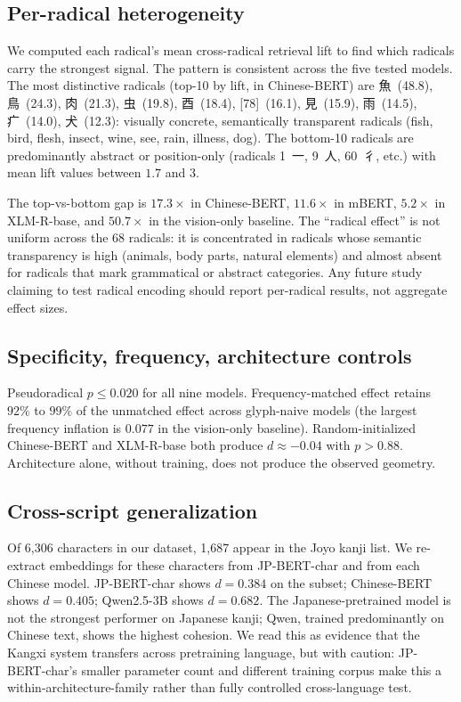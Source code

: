 \documentclass[11pt,a4paper,twocolumn]{article}
\begin{document}
\subsection{Per-radical heterogeneity}
We computed each radical's mean cross-radical retrieval lift to find
which radicals carry the strongest signal. The pattern is consistent
across the five tested models. The most distinctive radicals (top-10
by lift, in Chinese-BERT) are 魚~(48.8), 鳥~(24.3), 肉~(21.3),
虫~(19.8), 酉~(18.4), [78]~(16.1), 見~(15.9), 雨~(14.5), 疒~(14.0),
犬~(12.3): visually concrete, semantically transparent radicals (fish,
bird, flesh, insect, wine, see, rain, illness, dog). The bottom-10
radicals are predominantly abstract or position-only (radicals
1~一, 9~人, 60~彳, etc.) with mean lift values between $1.7$ and $3$.

The top-vs-bottom gap is $17.3\times$ in Chinese-BERT, $11.6\times$ in
mBERT, $5.2\times$ in XLM-R-base, and $50.7\times$ in the vision-only
baseline. The ``radical effect'' is not uniform across the 68 radicals:
it is concentrated in radicals whose semantic transparency is high
(animals, body parts, natural elements) and almost absent for radicals
that mark grammatical or abstract categories. Any future study
claiming to test radical encoding should report per-radical results,
not aggregate effect sizes.

\subsection{Specificity, frequency, architecture controls}
Pseudoradical $p \le 0.020$ for all nine models. Frequency-matched
effect retains $92\%$ to $99\%$ of the unmatched effect across
glyph-naive models (the largest frequency inflation is $0.077$ in the
vision-only baseline). Random-initialized Chinese-BERT and XLM-R-base
both produce $d \approx -0.04$ with $p > 0.88$. Architecture alone,
without training, does not produce the observed geometry.

\subsection{Cross-script generalization}
Of 6{,}306 characters in our dataset, 1{,}687 appear in the Joyo kanji
list. We re-extract embeddings for these characters from JP-BERT-char
and from each Chinese model. JP-BERT-char shows $d = 0.384$ on the
subset; Chinese-BERT shows $d = 0.405$; Qwen2.5-3B shows $d = 0.682$.
The Japanese-pretrained model is not the strongest performer on
Japanese kanji; Qwen, trained predominantly on Chinese text, shows the
highest cohesion. We read this as evidence that the Kangxi system
transfers across pretraining language, but with caution: JP-BERT-char's
smaller parameter count and different training corpus make this a
within-architecture-family rather than fully controlled cross-language
test.
\end{document}

